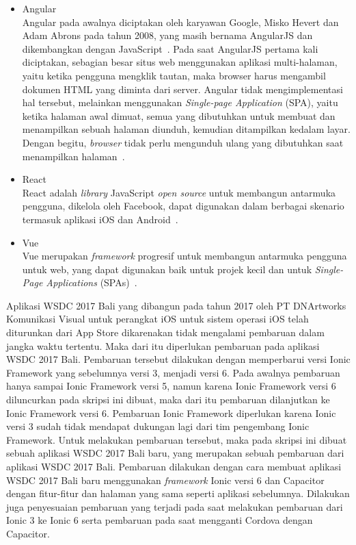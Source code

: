 \begin{itemize}
	\item Angular \\
	Angular pada awalnya diciptakan oleh karyawan Google, Misko Hevert dan Adam Abrons pada tahun 2008, yang masih bernama AngularJS dan dikembangkan dengan JavaScript~\cite{wohlgethan:18:supporting}. Pada saat AngularJS pertama kali diciptakan, sebagian besar situs web menggunakan aplikasi multi-halaman, yaitu ketika pengguna mengklik tautan, maka browser harus mengambil dokumen HTML yang diminta dari server. Angular tidak mengimplementasi hal tersebut, melainkan menggunakan \textit{Single-page Application} (SPA), yaitu ketika halaman awal dimuat, semua yang dibutuhkan untuk membuat dan menampilkan sebuah halaman diunduh, kemudian ditampilkan kedalam layar. Dengan begitu, \textit{browser} tidak perlu  mengunduh ulang yang dibutuhkan saat menampilkan halaman~\cite{scott:15:spa}.
	
	\item React \\
	React adalah \textit{library} JavaScript {\it open source} untuk membangun antarmuka pengguna, dikelola oleh Facebook, dapat digunakan dalam berbagai skenario termasuk aplikasi iOS dan Android~\cite{wohlgethan:18:supporting}.
	
	\item Vue \\
	 Vue merupakan \textit{framework} progresif untuk membangun antarmuka pengguna untuk web, yang dapat digunakan baik untuk projek kecil dan untuk {\it Single-Page Applications} (SPAs)~\cite{wohlgethan:18:supporting}.
\end{itemize}

Aplikasi WSDC 2017 Bali yang dibangun pada tahun 2017 oleh PT DNArtworks Komunikasi Visual untuk perangkat iOS untuk sistem operasi iOS telah diturunkan dari App Store dikarenakan tidak mengalami pembaruan dalam jangka waktu tertentu. Maka dari itu diperlukan pembaruan pada aplikasi WSDC 2017 Bali. Pembaruan tersebut dilakukan dengan memperbarui versi Ionic Framework yang sebelumnya versi 3, menjadi versi 6. Pada awalnya pembaruan hanya sampai Ionic Framework versi 5, namun karena Ionic Framework versi 6 diluncurkan pada skripsi ini dibuat, maka dari itu pembaruan dilanjutkan ke Ionic Framework versi 6. Pembaruan Ionic Framework diperlukan karena Ionic versi 3 sudah tidak mendapat dukungan lagi dari tim pengembang Ionic Framework. Untuk melakukan pembaruan tersebut, maka pada skripsi ini dibuat sebuah aplikasi WSDC 2017 Bali baru, yang merupakan sebuah pembaruan dari aplikasi WSDC 2017 Bali. Pembaruan dilakukan dengan cara membuat aplikasi WSDC 2017 Bali baru menggunakan \textit{framework} Ionic versi 6 dan Capacitor dengan fitur-fitur dan halaman yang sama seperti aplikasi sebelumnya. Dilakukan juga penyesuaian pembaruan yang terjadi pada saat melakukan pembaruan dari Ionic 3 ke Ionic 6 serta pembaruan pada saat mengganti Cordova dengan Capacitor. 


